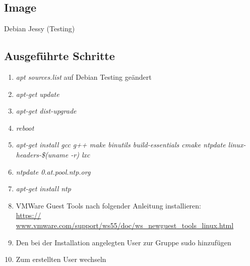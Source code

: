 \documentclass[main.tex]{subfiles}
\begin{document}
\subsection{Image}

Debian Jessy (Testing)

\subsection{Ausgeführte Schritte}
\begin{enumerate}
	\item \textit{apt sources.list} auf Debian Testing geändert
	\item \textit{apt-get update}
	\item \textit{apt-get dist-upgrade}
	\item \textit{reboot}
	\item \textit{apt-get install gcc g++ make binutils build-essentials cmake ntpdate linux-headers-\$(uname -r) lxc}
	\item \textit{ntpdate 0.at.pool.ntp.org}
	\item \textit{apt-get install ntp}
	\item VMWare Guest Tools nach folgender Anleitung installieren: \\ \url{https://		www.vmware.com/support/ws55/doc/ws_newguest_tools_linux.html} 
	\item Den bei der Installation angelegten User zur Gruppe sudo hinzufügen
	\item Zum erstellten User wechseln
\end{enumerate}
\end{document}
